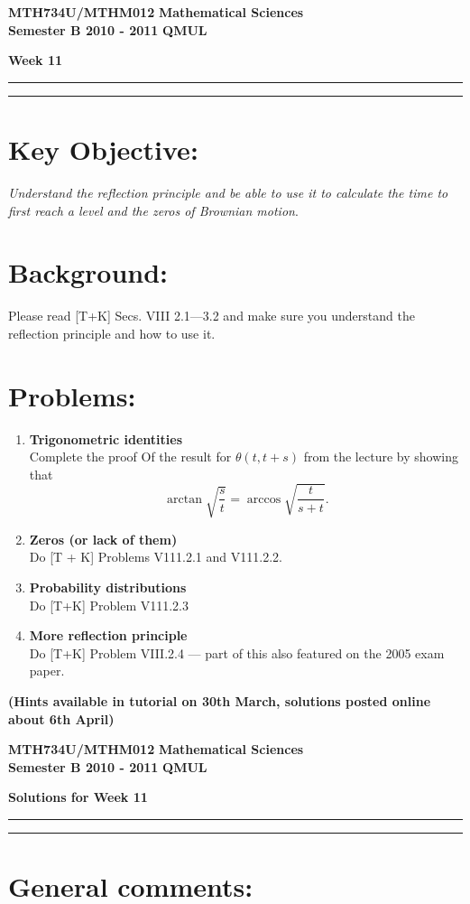 \documentclass[11pt,a4paper]{article}
\begin{document}
  \textbf{MTH734U/MTHM012} \hfill \textbf{Mathematical Sciences}\\
  \textbf{Semester B 2010 - 2011} \hfill \textbf{QMUL}
  \begin{center}
    \textbf{\huge Week 11}
  \end{center}
  \hrule \vspace{2mm} \hrule

  \section*{Key Objective:}
  \textit{Understand the reflection principle and be able to use it to calculate the time to first reach a level and the zeros of Brownian motion}.

  \section*{Background:}
  Please read [T+K] Secs. VIII 2.1—3.2 and make sure you understand the reflection principle and how to use it.
  \newpage

  \section*{Problems:}
  \begin{enumerate}
    \item \textbf{Trigonometric identities}\\
    Complete the proof Of the result for $\theta(t, t + s)$ from the lecture by showing that
    $$
    \arctan\sqrt{\frac{s}{t}} = \arccos\sqrt{\frac{t}{s + t}}.
    $$
    \item \textbf{Zeros (or lack of them)}\\
    Do [T + K] Problems V111.2.1 and V111.2.2.
    \item \textbf{Probability distributions}\\
    Do [T+K] Problem V111.2.3
    \item \textbf{More reflection principle}\\
    Do [T+K] Problem VIII.2.4 — part of this also featured on the 2005 exam paper.\par 
    [Note that the question in the book contains an obvious typo (the "m" at the very bottom of page 497 should be a "z"); don't forget to answer the part overleaf as well...]
  \end{enumerate}
  \textbf{(Hints available in tutorial on 30th March, solutions posted online about 6th April)}
  \newpage

  \textbf{MTH734U/MTHM012} \hfill \textbf{Mathematical Sciences}\\
  \textbf{Semester B 2010 - 2011} \hfill \textbf{QMUL}
  \begin{center}
    \textbf{\huge Solutions for Week 11}
  \end{center}
  \hrule \vspace{2mm} \hrule

  \section*{General comments:}
\end{document}

